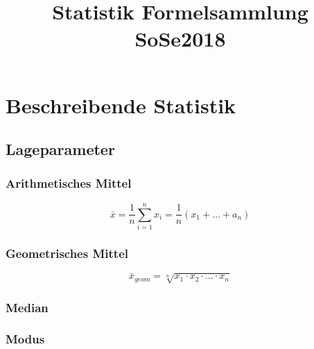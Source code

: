 \documentclass[a4paper, 12pt, landscape]{article}
\title{Statistik Formelsammlung SoSe2018}
\begin{document}
\section{Beschreibende Statistik}
\subsection{Lageparameter}
\subsubsection{Arithmetisches Mittel}

\[\bar{x}=\frac{1}{n}\sum \limits_{i=1}^n x_i=\frac{1}{n}(x_1 + \dots + a_n)\]

\subsubsection{Geometrisches Mittel}

\[\bar{x}_{geom} = \sqrt[n]{x_1 \cdot x_2 \cdot \dots \cdot x_n}\]

\subsubsection{Median}

\subsubsection{Modus}

\paragraph{}
\subparagraph{}
\end{document}
